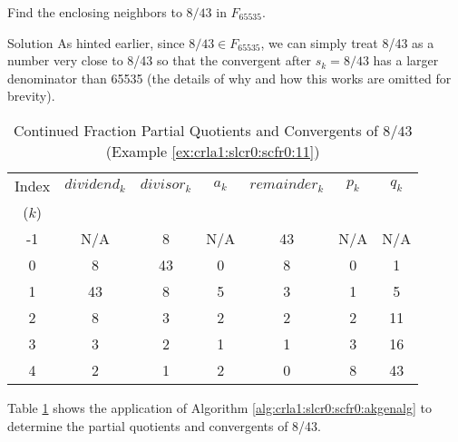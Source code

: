 \begin{vworkexamplestatement}
\label{ex:crla1:slcr0:scfr0:11}
Find the enclosing neighbors to $8/43$ in $F_{65535}$.
\end{vworkexamplestatement}
\begin{vworkexampleparsection}{Solution} As hinted earlier,
since $8/43 \in F_{65535}$, we can simply treat 8/43 as a number very close to 8/43
so that the convergent after $s_k = 8/43$ has a larger denominator than 65535 (the details
of why and how this works are omitted for brevity).

\begin{table}
\caption{Continued Fraction Partial Quotients and Convergents of $8/43$ (Example \ref{ex:crla1:slcr0:scfr0:11})}
\label{tbl:crla1:slcr0:scfr0:11a}
\begin{center}
\begin{tabular}{|c|c|c|c|c|c|c|}
\hline
\small{Index} & \small{$dividend_k$} & \small{$divisor_k$} & \small{$a_k$} & \small{$remainder_k$} & \small{$p_k$} & \small{$q_k$} \\
\small{($k$)} &                      &                     &               &                       &               &               \\
\hline
\hline
\small{-1}    & \small{N/A}          & \small{8}           & \small{N/A}   & \small{43}            & \small{N/A}   & \small{N/A}   \\
\hline
\small{0}     & \small{8}            & \small{43}          & \small{0}     & \small{8}             & \small{0}     & \small{1}     \\
\hline
\small{1}     & \small{43}           & \small{8}           & \small{5}     & \small{3}             & \small{1}     & \small{5}     \\
\hline
\small{2}     & \small{8}            & \small{3}           & \small{2}     & \small{2}             & \small{2}     & \small{11}    \\
\hline
\small{3}     & \small{3}            & \small{2}           & \small{1}     & \small{1}             & \small{3}     & \small{16}    \\
\hline
\small{4}     & \small{2}            & \small{1}           & \small{2}     & \small{0}             & \small{8}     & \small{43}    \\
\hline
\end{tabular}
\end{center}
\end{table}

Table \ref{tbl:crla1:slcr0:scfr0:11a} shows the
application of 
Algorithm \ref{alg:crla1:slcr0:scfr0:akgenalg}
to determine the partial quotients and convergents of 8/43.


\end{vworkexampleparsection}
